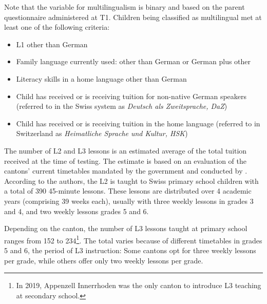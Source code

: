 \documentclass[output=paper]{langsci/langscibook}
\begin{document}
Note that the variable for multilingualism is binary and based on the parent questionnaire administered at T1. Children being classified as multilingual met at least one of the following criteria:

\begin{itemize}
\item L1 other than German
\item Family language currently used: other than German or German plus other
\item Literacy skills in a home language other than German
\item Child has received or is receiving tuition for non-native German speakers (referred to in the Swiss system as \textit{Deutsch als Zweitsprache, DaZ})
\item Child has received or is receiving tuition in the home language (referred to in Switzerland as \textit{Heimatliche Sprache und Kultur, HSK})
\end{itemize}

The number of L2 and L3 lessons is an estimated average of the total tuition received at the time of testing. The estimate is based on an evaluation of the cantons’ current timetables mandated by the government and conducted by \citet{BucherZemp2019}. According to the authors, the L2 is taught to Swiss primary school children with a total of 390 45-minute lessons. These lessons are distributed over 4 academic years (comprising 39 weeks each), usually with three weekly lessons in grades 3 and 4, and two weekly lessons grades 5 and 6.

Depending on the canton, the number of L3 lessons taught at primary school ranges from 152 to 234\footnote{In 2019, Appenzell Innerrhoden was the only canton to introduce L3 teaching at secondary school.}. The total varies because of different timetables in grades 5 and 6, the period of L3 instruction: Some cantons opt for three weekly lessons per grade, while others offer only two weekly lessons per grade. 
\end{document}
